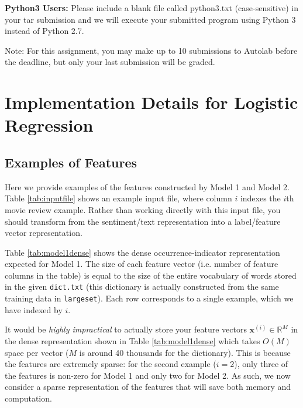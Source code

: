\documentclass[11pt]{article}
\numberwithin{equation}{section} %
\numberwithin{figure}{section} %
\numberwithin{table}{section} %
\newcommand{\Rb}{\mathbb{R}}
\newcommand{\xv}{\mathbf{x}}
\begin{document}
 \begin{notebox}
  {\bf Python3 Users:} Please include a blank file called python3.txt (case-sensitive) in your tar submission and we will execute your submitted program using Python 3 instead of Python 2.7.
 \end{notebox}

Note: For this assignment, you may make up to 10 submissions to Autolab before the deadline, but only your last submission will be graded.
    
    


\newpage

\appendix


\section{Implementation Details for Logistic Regression}

\subsection{Examples of Features}

Here we provide examples of the features constructed by Model 1 and Model 2. Table \ref{tab:inputfile} shows an example input file, where column $i$  indexes the $i$th movie review example. Rather than working directly with this input file, you should transform from the sentiment/text representation into a label/feature vector representation.

Table \ref{tab:model1dense} shows the dense occurrence-indicator representation expected for Model 1. The size of each feature vector (i.e. number of feature columns in the table) is equal to the size of the entire vocabulary of words stored in the given \lstinline{dict.txt} (this dictionary is actually constructed from the same training data in \lstinline{largeset}). Each row corresponds to a single example, which we have indexed by $i$.

It would be \emph{highly impractical} to actually store your feature vectors $\xv^{(i)} \in \Rb^M$ in the dense representation shown in Table \ref{tab:model1dense} which takes $O(M)$ space per vector ($M$ is around 40 thousands for the dictionary). This is because the features are extremely sparse: for the second example ($i=2$), only three of the features is non-zero for Model 1 and only two for Model 2. As such, we now consider a sparse representation of the features that will save both memory and computation.
\end{document}
